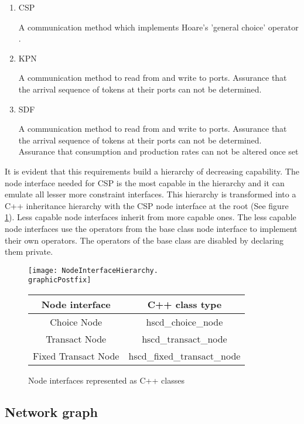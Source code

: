 \begin{enumerate}
\item CSP

A communication method which implements Hoare's 'general choice' operator \cite{csphoare:1985}.

\item KPN

A communication method to read from and write to ports.
Assurance that the arrival sequence of tokens at
their ports can not be determined.

\item SDF

A communication method to read from and write to ports.
Assurance that the arrival sequence of tokens at
their ports can not be determined.
Assurance that consumption and production rates can not
be altered once set

\end{enumerate}

It is evident that this requirements build a hierarchy of decreasing
capability. The node interface needed for CSP is the most capable
in the hierarchy and it can emulate all lesser more constraint interfaces.
This hierarchy is transformed into a C++ inheritance hierarchy with the
CSP node interface at the root (See figure \ref{node-interface-c++}).
Less capable node interfaces inherit from more capable ones. The
less capable node interfaces use the operators from the base class node
interface to implement their own operators. The operators of the
base class are disabled by declaring them private.

\begin{figure}
\centering
\texttt{[image: NodeInterfaceHierarchy.\\graphicPostfix]}\\
\begin{tabular}{|c|c|}
\hline
 Node interface & C++ class type \\
\hline \hline
 Choice Node          & hscd\_choice\_node \\
 Transact Node        & hscd\_transact\_node \\
 Fixed Transact Node  & hscd\_fixed\_transact\_node \\
\hline
\end{tabular}
\caption{\label{node-interface-c++}Node interfaces represented as C++ classes}
\end{figure}

\subsection{Network graph}



